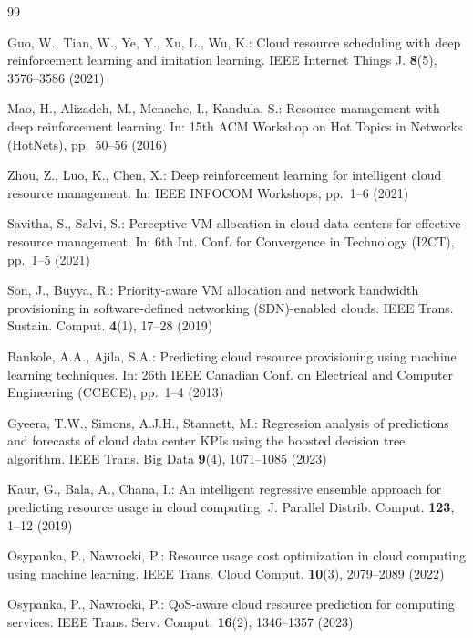 \documentclass[runningheads]{llncs}
\begin{document}
\begin{thebibliography}{99}

Guo, W., Tian, W., Ye, Y., Xu, L., Wu, K.: Cloud resource scheduling with deep reinforcement learning and imitation learning. IEEE Internet Things J. \textbf{8}(5), 3576--3586 (2021)

Mao, H., Alizadeh, M., Menache, I., Kandula, S.: Resource management with deep reinforcement learning. In: 15th ACM Workshop on Hot Topics in Networks (HotNets), pp.~50--56 (2016)

Zhou, Z., Luo, K., Chen, X.: Deep reinforcement learning for intelligent cloud resource management. In: IEEE INFOCOM Workshops, pp.~1--6 (2021)

Savitha, S., Salvi, S.: Perceptive VM allocation in cloud data centers for effective resource management. In: 6th Int. Conf. for Convergence in Technology (I2CT), pp.~1--5 (2021)

Son, J., Buyya, R.: Priority-aware VM allocation and network bandwidth provisioning in software-defined networking (SDN)-enabled clouds. IEEE Trans. Sustain. Comput. \textbf{4}(1), 17--28 (2019)

Bankole, A.A., Ajila, S.A.: Predicting cloud resource provisioning using machine learning techniques. In: 26th IEEE Canadian Conf. on Electrical and Computer Engineering (CCECE), pp.~1--4 (2013)

Gyeera, T.W., Simons, A.J.H., Stannett, M.: Regression analysis of predictions and forecasts of cloud data center KPIs using the boosted decision tree algorithm. IEEE Trans. Big Data \textbf{9}(4), 1071--1085 (2023)

Kaur, G., Bala, A., Chana, I.: An intelligent regressive ensemble approach for predicting resource usage in cloud computing. J. Parallel Distrib. Comput. \textbf{123}, 1--12 (2019)

Osypanka, P., Nawrocki, P.: Resource usage cost optimization in cloud computing using machine learning. IEEE Trans. Cloud Comput. \textbf{10}(3), 2079--2089 (2022)

Osypanka, P., Nawrocki, P.: QoS-aware cloud resource prediction for computing services. IEEE Trans. Serv. Comput. \textbf{16}(2), 1346--1357 (2023)

\end{thebibliography}
\end{document}
